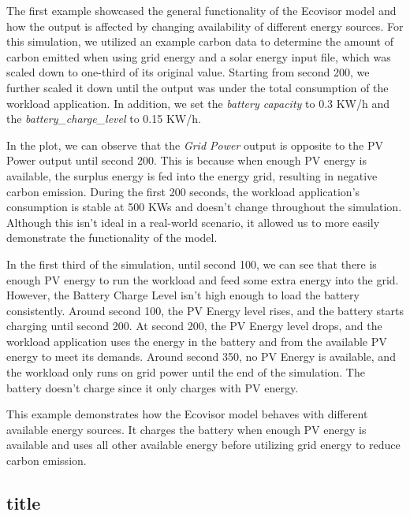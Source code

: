 The first example showcased the general functionality of the Ecovisor model and how the output is affected by changing availability of different energy sources. For this simulation, we utilized an example carbon data to determine the amount of carbon emitted when using grid energy and a solar energy input file, which was scaled down to one-third of its original value. Starting from second 200, we further scaled it down until the output was under the total consumption of the workload application. In addition, we set the \textit{battery capacity} to 0.3 KW/h and the \textit{battery\_charge\_level} to 0.15 KW/h.

In the plot, we can observe that the \textit{Grid Power} output is opposite to the PV Power output until second 200. This is because when enough PV energy is available, the surplus energy is fed into the energy grid, resulting in negative carbon emission. During the first 200 seconds, the workload application's consumption is stable at 500 KWs and doesn't change throughout the simulation. Although this isn't ideal in a real-world scenario, it allowed us to more easily demonstrate the functionality of the model.

In the first third of the simulation, until second 100, we can see that there is enough PV energy to run the workload and feed some extra energy into the grid. However, the Battery Charge Level isn't high enough to load the battery consistently. Around second 100, the PV Energy level rises, and the battery starts charging until second 200. At second 200, the PV Energy level drops, and the workload application uses the energy in the battery and from the available PV energy to meet its demands. Around second 350, no PV Energy is available, and the workload only runs on grid power until the end of the simulation. The battery doesn't charge since it only charges with PV energy.

This example demonstrates how the Ecovisor model behaves with different available energy sources. It charges the battery when enough PV energy is available and uses all other available energy before utilizing grid energy to reduce carbon emission.

\subsection{title}